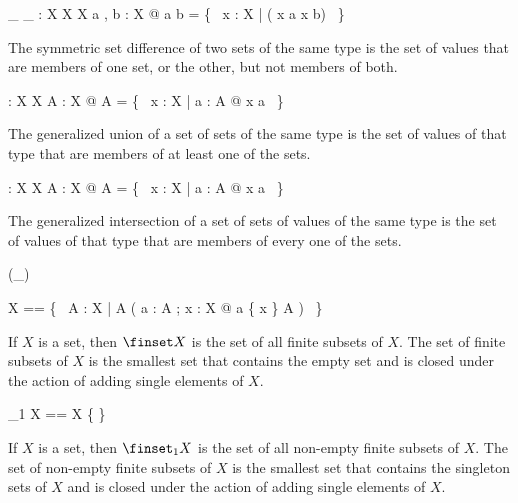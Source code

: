 \documentclass[draft,a4paper,10pt,wd]{isov2}
\begin{document}
\begin{gendef}[X]
\_ \symdiff \_ : \power X \cross \power X \fun \power X
\where
\forall a , b : \power X @ a \symdiff b = \{~ x : X | \lnot ( x \in a \iff x \in b) ~\}
\end{gendef}

The symmetric set difference of two sets of the same type is
the set of values that are members of one set, or the other,
but not members of both.


\begin{gendef}[X]
\bigcup : \power \power X  \fun \power X
\where
\forall A : \power \power X @ \bigcup A = \{~ x : X | \exists a : A @ x \in a ~\}
\end{gendef}

The generalized union of a set of sets of the same type is
the set of values of that type that are members of at least one of the sets.


\begin{gendef}[X]
\bigcap : \power \power X \fun \power X
\where
\forall A : \power \power X @ \bigcap A = \{~ x : X | \forall a : A @ x \in a ~\}
\end{gendef}

The generalized intersection of a set of sets of values of the same
type is the set of values of that type that are members of
every one of the sets.



\begin{zed}
\generic (\finset \_)
\end{zed}

\begin{zed}
\finset X == \bigcap \{~ A : \power \power X |
	\emptyset \in A \land ( \forall a : A ; x : X @ a \cup \{ x \} \in A ) ~\}
\end{zed}

If $X$ is a set,
then $\finset X$ is the set of all finite subsets of $X$.
The set of finite subsets of $X$ is the smallest set that contains the empty set
and is closed under the action of adding single elements of $X$.


\begin{zed}
\finset_1 X == \finset X \setminus \{ \emptyset \}
\end{zed}

If $X$ is a set,
then $\finset_1 X$ is the set of all non-empty finite subsets of $X$.
The set of non-empty finite subsets of $X$ is the smallest set that contains
the singleton sets of $X$ and is closed under the action of adding single
elements of $X$.
\end{document}
